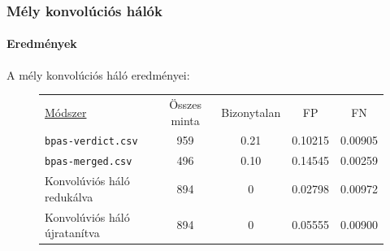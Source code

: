 \documentclass[11pt]{beamer}
\begin{document}
\begin{frame}
	\frametitle{Mély konvolúciós hálók}
	\framesubtitle{Eredmények}

	A mély konvolúciós háló eredményei:
	
	\begin{figure} [h!]
		\centering
		\begin{tabular}{ l c c c c  }
			\underline{Módszer} 			& Összes minta 	& Bizonytalan	& FP	& FN \\
			\texttt{bpas-verdict.csv} 	& 959 			& 0.21			& 0.10215 	& 0.00905 	\\
			\texttt{bpas-merged.csv}  	& 496			& 0.10			& 0.14545 	& 0.00259   \\
			
			\hline
			Konvolúviós háló redukálva\footnotemark 	& 894			& 0				& 0.02798	& 0.00972	\\
			Konvolúviós háló újratanítva& 894			& 0				& 0.05555	& 0.00900	\\
			
			
		\end{tabular} 
		
	\end{figure}

\end{frame}
\end{document}
